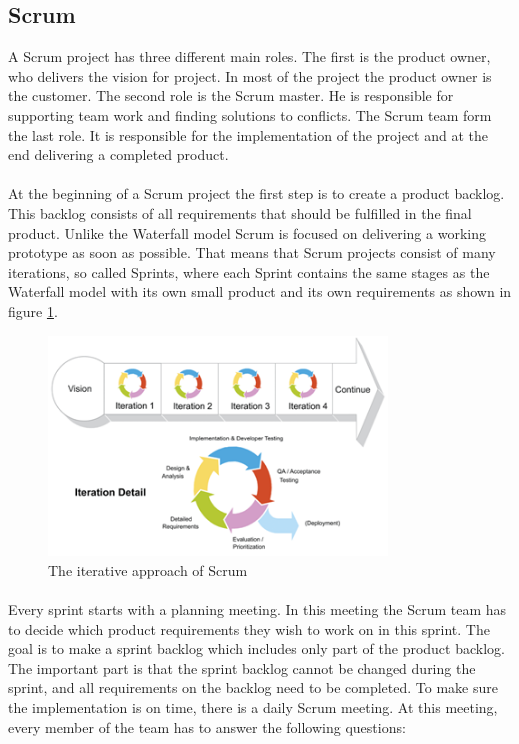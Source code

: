 \subsection{Scrum}
\label{subsec:PrelimMethodScrum}

A Scrum project has three different main roles. The first is the product owner, who delivers the vision for project. In most of the project the product owner is the customer. The second role is the Scrum master. He is responsible for supporting team work and finding solutions to conflicts. The Scrum team form the last role. It is responsible for the implementation of the project and at the end delivering a completed product.

\paragraph{} At the beginning of a Scrum project the first step is to create a product backlog. This backlog consists of all requirements that should be fulfilled in the final product. Unlike the Waterfall model Scrum is focused on delivering a working prototype as soon as possible. That means that Scrum projects consist of many iterations, so called Sprints, where each Sprint contains the same stages as the Waterfall model with its own small product and its own requirements as shown in figure \ref{fig:PrelimMethodScrumIter}.

\begin{figure}[ht!]
  \centering
  \includegraphics[width=90mm]{./PreliminaryStudies/img/scrum}
  \caption{The iterative approach of Scrum}
  \label{fig:PrelimMethodScrumIter}
\end{figure}

\paragraph{} Every sprint starts with a planning meeting. In this meeting the Scrum team has to decide which product requirements they wish to work on in this sprint. The goal is to make a sprint backlog which includes only part of the product backlog. The important part is that the sprint backlog cannot be changed during the sprint, and all requirements on the backlog need to be completed. To make sure the implementation is on time, there is a daily Scrum meeting. At this meeting, every member of the team has to answer the following questions:

